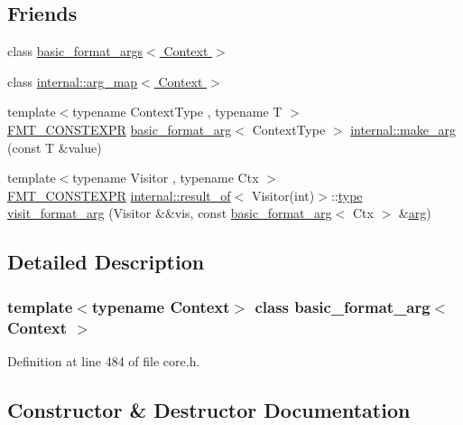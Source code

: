 \subsection*{Friends}
\begin{DoxyCompactItemize}
\item 
class \hyperlink{classbasic__format__arg_ab8e9e33cc7b78829001a86ef6110ebb6}{basic\+\_\+format\+\_\+args$<$ Context $>$}
\item 
class \hyperlink{classbasic__format__arg_a7974100f026be256213827458684be38}{internal\+::arg\+\_\+map$<$ Context $>$}
\item 
{\footnotesize template$<$typename Context\+Type , typename T $>$ }\\\hyperlink{core_8h_a69201cb276383873487bf68b4ef8b4cd}{F\+M\+T\+\_\+\+C\+O\+N\+S\+T\+E\+X\+PR} \hyperlink{classbasic__format__arg}{basic\+\_\+format\+\_\+arg}$<$ Context\+Type $>$ \hyperlink{classbasic__format__arg_ae7aafc9e488aab46969a5eae2da3d96b}{internal\+::make\+\_\+arg} (const T \&value)
\item 
{\footnotesize template$<$typename Visitor , typename Ctx $>$ }\\\hyperlink{core_8h_a69201cb276383873487bf68b4ef8b4cd}{F\+M\+T\+\_\+\+C\+O\+N\+S\+T\+E\+X\+PR} \hyperlink{structinternal_1_1result__of}{internal\+::result\+\_\+of}$<$ Visitor(int)$>$\+::\hyperlink{classbasic__format__arg_adf7349643b80568c84a5872b89b2f141}{type} \hyperlink{classbasic__format__arg_a6b43571a7a4497973eda87872423bd13}{visit\+\_\+format\+\_\+arg} (Visitor \&\&vis, const \hyperlink{classbasic__format__arg}{basic\+\_\+format\+\_\+arg}$<$ Ctx $>$ \&\hyperlink{core_8h_ab87859023d64d26171b1e74a3d0c3b99}{arg})
\end{DoxyCompactItemize}


\subsection{Detailed Description}
\subsubsection*{template$<$typename Context$>$\newline
class basic\+\_\+format\+\_\+arg$<$ Context $>$}



Definition at line 484 of file core.\+h.



\subsection{Constructor \& Destructor Documentation}
\mbox{\label{classbasic__format__arg_a26cca2d5a0c9da5edb3316f481eae3ec}} 
